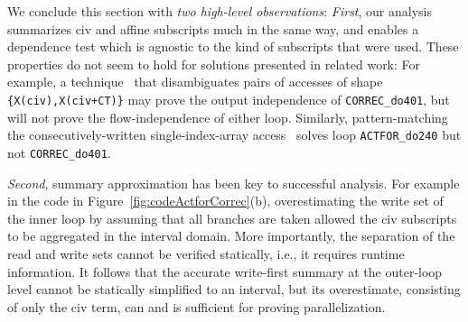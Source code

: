 \documentclass{sig-alternate}
\begin{document}
\vspace{1ex}
We conclude this section with {\em two high-level observations}: %
{\em First}, our analysis summarizes {\sc civ} and affine subscripts
much in the same way, and enables a dependence test which is agnostic
to the kind of subscripts that were used.
%
% 
%
These properties do not seem to hold for solutions presented in related
work: For example, a technique~\cite{CohenBeyondMon} that disambiguates 
pairs of accesses of shape {\tt \{X(civ),X(civ+CT)\}} may prove the output 
independence of {\tt CORREC\_do401}, but will not prove the flow-independence 
of either loop.
Similarly, pattern-matching the consecutively-written single-index-array
access~\cite{PaduaStackArr,VEG} solves loop  {\tt ACTFOR\_do240} but not
{\tt CORREC\_do401}.


{\em Second}, summary approximation has been key to successful
analysis. For example in the code in Figure~\ref{fig:codeActforCorrec}(b), 
overestimating the write set of the inner loop by assuming that all 
branches are taken allowed the {\sc civ} subscripts to be aggregated in the 
interval domain. 
More importantly, the separation of the read and write sets cannot 
be verified statically, i.e., it requires runtime information. 
%
It follows that the accurate write-first summary at the 
outer-loop level cannot be statically simplified to an interval,
but its overestimate, consisting of only the {\sc civ} term, 
can and is sufficient for proving parallelization.
\end{document}
